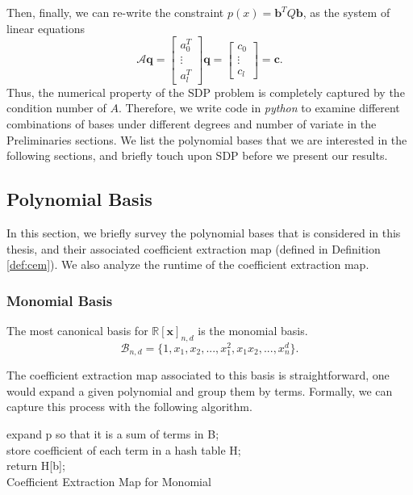 \documentclass[12pt]{amsart}
\numberwithin{equation}{section}
\theoremstyle{definition}
\numberwithin{thm}{section}
\begin{document}
\smallskip
Then, finally, we can re-write the constraint $p(x) = \mathbf{b}^T Q \mathbf{b}$, as the system of linear equations 
\begin{equation*}
     \mathcal{A} \mathbf{q} = \begin{bmatrix}
          a_0^T \\
          \vdots \\
          a_l^T
     \end{bmatrix} \mathbf{q} = \begin{bmatrix}
          c_0 \\
          \vdots \\
          c_l
     \end{bmatrix} = \mathbf{c}.
\end{equation*}
Thus, the numerical property of the SDP problem is completely captured by the condition number of $A$. 
Therefore, we write code in \emph{python} to examine different combinations of bases under different degrees and number of variate in the Preliminaries sections. 
We list the polynomial bases that we are interested in the following sections, and briefly touch upon SDP before we present our results.

\subsection{Polynomial Basis}
\label{Sec:polynomial Basis}
In this section, we briefly survey the polynomial bases that is considered in this thesis,
and their associated {coefficient extraction map} (defined in Definition \ref{def:cem}).
We also analyze the runtime of the {coefficient extraction map}.

\subsubsection{Monomial Basis}
\label{alg:mcem}
The most canonical basis for $\mathbb{R}[\mathbf{x}]_{n, d}$ is the monomial basis. 
\begin{equation*}
     \mathcal{B}_{n, d} = \{1, x_1, x_2, ..., x_1^2, x_1 x_2, ..., x_n^d\}.
\end{equation*}

The {coefficient extraction map} associated to this basis is straightforward, 
one would expand a given polynomial and group them by terms. Formally, we can capture this process with the following algorithm.

\begin{algorithm}[H]
     
     \SetAlgoLined
     expand p so that it is a sum of terms in B;\\
     store coefficient of each term in a hash table H;\\
     return H[b];\\
     \caption{Coefficient Extraction Map for Monomial}
\end{algorithm}
\end{document}

